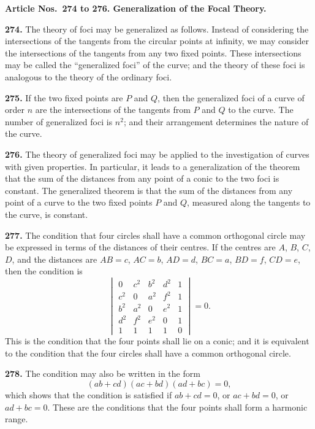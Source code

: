 \documentclass[12pt,a4paper]{article}
\theoremstyle{definition}
\begin{document}
\vspace{0.5em}
\noindent\textbf{Article Nos.~274 to 276. Generalization of the Focal Theory.}

\vspace{0.3em}
\noindent\textbf{274.} The theory of foci may be generalized as follows. Instead of considering
the intersections of the tangents from the circular points at infinity, we may consider
the intersections of the tangents from any two fixed points. These intersections may
be called the ``generalized foci'' of the curve; and the theory of these foci is analogous
to the theory of the ordinary foci.

\noindent\textbf{275.} If the two fixed points are $P$ and $Q$, then the generalized foci of a curve
of order $n$ are the intersections of the tangents from $P$ and $Q$ to the curve. The
number of generalized foci is $n^2$; and their arrangement determines the nature of the
curve.

\noindent\textbf{276.} The theory of generalized foci may be applied to the investigation of curves
with given properties. In particular, it leads to a generalization of the theorem that
the sum of the distances from any point of a conic to the two foci is constant. The
generalized theorem is that the sum of the distances from any point of a curve to the
two fixed points $P$ and $Q$, measured along the tangents to the curve, is constant.

\newpage
\noindent\textbf{277.} The condition that four circles shall have a common orthogonal circle
may be expressed in terms of the distances of their centres. If the centres are
$A$, $B$, $C$, $D$, and the distances are $AB = c$, $AC = b$, $AD = d$, $BC = a$, $BD = f$, $CD = e$,
then the condition is
\[
\begin{vmatrix}
0 & c^2 & b^2 & d^2 & 1 \\
c^2 & 0 & a^2 & f^2 & 1 \\
b^2 & a^2 & 0 & e^2 & 1 \\
d^2 & f^2 & e^2 & 0 & 1 \\
1 & 1 & 1 & 1 & 0
\end{vmatrix}
= 0.
\]
This is the condition that the four points shall lie on a conic; and it is equivalent to
the condition that the four circles shall have a common orthogonal circle.

\noindent\textbf{278.} The condition may also be written in the form
\[
(ab + cd)(ac + bd)(ad + bc) = 0,
\]
which shows that the condition is satisfied if $ab + cd = 0$, or $ac + bd = 0$, or $ad + bc = 0$.
These are the conditions that the four points shall form a harmonic range.
\end{document}
